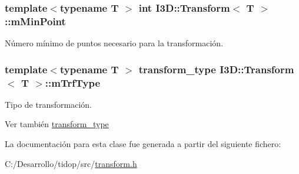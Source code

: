 \subsubsection[{\texorpdfstring{m\+Min\+Point}{mMinPoint}}]{\setlength{\rightskip}{0pt plus 5cm}template$<$typename T $>$ int {\bf I3\+D\+::\+Transform}$<$ T $>$\+::m\+Min\+Point\hspace{0.3cm}{\ttfamily [protected]}}\hypertarget{class_i3_d_1_1_transform_a087716ea2e7fa31127003e50479ed01e}{}\label{class_i3_d_1_1_transform_a087716ea2e7fa31127003e50479ed01e}


Número mínimo de puntos necesario para la transformación. 

\subsubsection[{\texorpdfstring{m\+Trf\+Type}{mTrfType}}]{\setlength{\rightskip}{0pt plus 5cm}template$<$typename T $>$ {\bf transform\+\_\+type} {\bf I3\+D\+::\+Transform}$<$ T $>$\+::m\+Trf\+Type\hspace{0.3cm}{\ttfamily [protected]}}\hypertarget{class_i3_d_1_1_transform_a1d5c0d6ea45417608b00316a08f164d7}{}\label{class_i3_d_1_1_transform_a1d5c0d6ea45417608b00316a08f164d7}


Tipo de transformación. 

\begin{DoxySeeAlso}{Ver también}
\hyperlink{group__trf_group_ga175e1580b1ecbc0710ad48060d56c2a3}{transform\+\_\+type} 
\end{DoxySeeAlso}


La documentación para esta clase fue generada a partir del siguiente fichero\+:\begin{DoxyCompactItemize}
\item 
C\+:/\+Desarrollo/tidop/src/\hyperlink{transform_8h}{transform.\+h}\end{DoxyCompactItemize}
